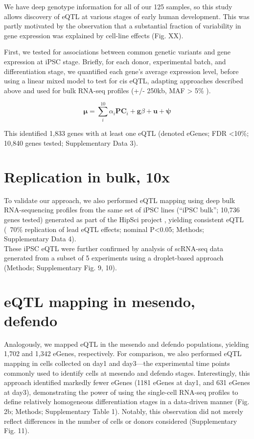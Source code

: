 We have deep genotype information for all of our 125 samples, so this study allows discovery of eQTL at various stages of early human development. 
This was partly motivated by the observation that a substantial fraction of variability in gene expression was explained by cell-line effects (Fig. XX).
 
First, we tested for associations between common genetic variants and gene expression at iPSC stage. 
Briefly, for each donor, experimental batch, and differentiation stage, we quantified each gene’s average expression level, before using a linear mixed model to test for cis eQTL, adapting approaches described above and used for bulk RNA-seq profiles (+/- 250kb, MAF > 5\% \cite{kilpinen2017common}). 

\begin{equation}
    \boldsymbol{\mu} = \sum_i^{10}\alpha_i \mathbf{PC}_i + \mathbf{g}\beta + \mathbf{u} + \boldsymbol{\psi}  
\end{equation}

This identified 1,833 genes with at least one eQTL (denoted eGenes; FDR <10\%; 10,840 genes tested; Supplementary Data 3). 

\section{Replication in bulk, 10x}

To validate our approach, we also performed eQTL mapping using deep bulk RNA-sequencing profiles from the same set of iPSC lines (“iPSC bulk”; 10,736 genes tested) generated as part of the HipSci project \cite{kilpinen2017common}, yielding consistent eQTL (~70\% replication of lead eQTL effects; nominal P<0.05; Methods; Supplementary Data 4).\\ 

These iPSC eQTL were further confirmed by analysis of scRNA-seq data generated from a subset of 5 experiments using a droplet-based approach (Methods; Supplementary Fig. 9, 10).

\section{eQTL mapping in mesendo, defendo}

Analogously, we mapped eQTL in the mesendo and defendo populations, yielding 1,702 and 1,342 eGenes, respectively. 
For comparison, we also performed eQTL mapping in cells collected on day1 and day3—the experimental time points commonly used to identify cells at mesendo and defendo stages.
Interestingly, this approach identified markedly fewer eGenes (1181 eGenes at day1, and 631 eGenes at day3), demonstrating the power of using the single-cell RNA-seq profiles to define relatively homogeneous differentiation stages in a data-driven manner (Fig. 2b; Methods; Supplementary Table 1). 
Notably, this observation did not merely reflect differences in the number of cells or donors considered (Supplementary Fig. 11).\\

